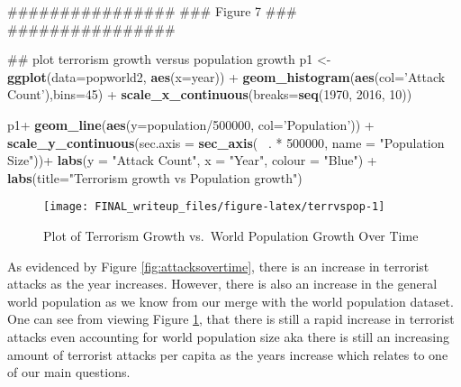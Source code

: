 \documentclass[11pt,letterpaper,]{article}
\newenvironment{Shaded}{\begin{snugshade}}{\end{snugshade}}
\newcommand{\KeywordTok}[1]{\textcolor[rgb]{0.13,0.29,0.53}{\textbf{{#1}}}}
\newcommand{\DataTypeTok}[1]{\textcolor[rgb]{0.13,0.29,0.53}{{#1}}}
\newcommand{\DecValTok}[1]{\textcolor[rgb]{0.00,0.00,0.81}{{#1}}}
\newcommand{\StringTok}[1]{\textcolor[rgb]{0.31,0.60,0.02}{{#1}}}
\newcommand{\NormalTok}[1]{{#1}}
\theoremstyle{definition}
\theoremstyle{definition}
\theoremstyle{definition}
\theoremstyle{remark}
\begin{document}
\begin{Shaded}
\begin{Highlighting}[]
\NormalTok{################}
\NormalTok{### Figure 7 ###}
\NormalTok{################}

\NormalTok{## plot terrorism growth versus population growth}
\NormalTok{p1 <-}\StringTok{ }\KeywordTok{ggplot}\NormalTok{(}\DataTypeTok{data=}\NormalTok{popworld2, }\KeywordTok{aes}\NormalTok{(}\DataTypeTok{x=}\NormalTok{year)) +}
\StringTok{  }\KeywordTok{geom_histogram}\NormalTok{(}\KeywordTok{aes}\NormalTok{(}\DataTypeTok{col=}\StringTok{'Attack Count'}\NormalTok{),}\DataTypeTok{bins=}\DecValTok{45}\NormalTok{) +}\StringTok{ }
\StringTok{  }\KeywordTok{scale_x_continuous}\NormalTok{(}\DataTypeTok{breaks=}\KeywordTok{seq}\NormalTok{(}\DecValTok{1970}\NormalTok{, }\DecValTok{2016}\NormalTok{, }\DecValTok{10}\NormalTok{))}

\NormalTok{p1+}\StringTok{ }\KeywordTok{geom_line}\NormalTok{(}\KeywordTok{aes}\NormalTok{(}\DataTypeTok{y=}\NormalTok{population/}\DecValTok{500000}\NormalTok{, }\DataTypeTok{col=}\StringTok{'Population'}\NormalTok{)) +}\StringTok{ }
\StringTok{    }\KeywordTok{scale_y_continuous}\NormalTok{(}\DataTypeTok{sec.axis =} \KeywordTok{sec_axis}\NormalTok{(~}\StringTok{ }\NormalTok{. *}\StringTok{ }\DecValTok{500000}\NormalTok{, }\DataTypeTok{name =} \StringTok{"Population Size"}\NormalTok{))+}
\StringTok{    }\KeywordTok{labs}\NormalTok{(}\DataTypeTok{y =} \StringTok{"Attack Count"}\NormalTok{, }\DataTypeTok{x =} \StringTok{"Year"}\NormalTok{, }\DataTypeTok{colour =} \StringTok{"Blue"}\NormalTok{) +}
\StringTok{    }\KeywordTok{labs}\NormalTok{(}\DataTypeTok{title=}\StringTok{"Terrorism growth vs Population growth"}\NormalTok{)}
\end{Highlighting}
\end{Shaded}

\begin{figure}

{\centering \texttt{[image: FINAL\_writeup\_files/figure-latex/terrvspop-1]} 

}

\caption{Plot of Terrorism Growth vs.~World Population Growth
Over Time}\label{fig:terrvspop}
\end{figure}

As evidenced by Figure \ref{fig:attacksovertime}, there is an increase
in terrorist attacks as the year increases. However, there is also an
increase in the general world population as we know from our merge with
the world population dataset. One can see from viewing Figure
\ref{fig:terrvspop}, that there is still a rapid increase in terrorist
attacks even accounting for world population size aka there is still an
increasing amount of terrorist attacks per capita as the years increase
which relates to one of our main questions.
\end{document}
